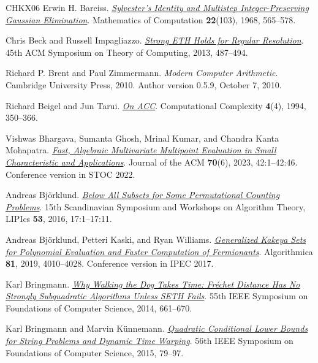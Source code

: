 \documentclass[11pt,reqno]{amsart}
\numberwithin{equation}{section}
\theoremstyle{definition}\newtheorem{definition}[theorem]{Definition}
\theoremstyle{remark}\newtheorem{remark}[theorem]{Remark}
\begin{document}
\begin{thebibliography}{CHKX06}
Erwin H. Bareiss.
\href{https://doi.org/10.1090/S0025-5718-1968-0226829-0}
{\emph{Sylvester's Identity and Multistep Integer-Preserving Gaussian Elimination}}.
Mathematics of Computation \textbf{22}(103), 1968, 565--578.

Chris Beck and Russell Impagliazzo.
\href{https://doi.org/10.1145/2488608.2488669}
{\emph{Strong ETH Holds for Regular Resolution}}.
45th ACM Symposium on Theory of Computing, 2013, 487--494.

Richard P. Brent and Paul Zimmermann.
\emph{Modern Computer Arithmetic}.
Cambridge University Press, 2010.
Author version 0.5.9, October 7, 2010.

Richard Beigel and Jun Tarui.
\href{https://doi.org/10.1007/BF01263423}
{\emph{On ACC}}.
Computational Complexity \textbf{4}(4), 1994, 350--366.

Vishwas Bhargava, Sumanta Ghosh, Mrinal Kumar, and Chandra Kanta Mohapatra.
\href{https://doi.org/10.1145/3625226}
{\emph{Fast, Algebraic Multivariate Multipoint Evaluation in Small
Characteristic and Applications}}.
Journal of the ACM \textbf{70}(6), 2023, 42:1--42:46.
Conference version in STOC 2022.

Andreas Bj\"orklund.
\href{https://doi.org/10.4230/LIPIcs.SWAT.2016.17}
{\emph{Below All Subsets for Some Permutational Counting Problems}}.
15th Scandinavian Symposium and Workshops on Algorithm Theory,
LIPIcs \textbf{53}, 2016, 17:1--17:11.

Andreas Bj\"orklund, Petteri Kaski, and Ryan Williams.
\href{https://doi.org/10.1007/s00453-018-0513-7}
{\emph{Generalized Kakeya Sets for Polynomial Evaluation and Faster
Computation of Fermionants}}.
Algorithmica \textbf{81}, 2019, 4010--4028.
Conference version in IPEC 2017.

Karl Bringmann.
\href{https://doi.org/10.1109/FOCS.2014.76}
{\emph{Why Walking the Dog Takes Time: Fr\'echet Distance Has No Strongly
Subquadratic Algorithms Unless SETH Fails}}.
55th IEEE Symposium on Foundations of Computer Science, 2014, 661--670.

Karl Bringmann and Marvin K\"unnemann.
\href{https://doi.org/10.1109/FOCS.2015.15}
{\emph{Quadratic Conditional Lower Bounds for String Problems and
Dynamic Time Warping}}.
56th IEEE Symposium on Foundations of Computer Science, 2015, 79--97.


\end{thebibliography}
\end{document}

